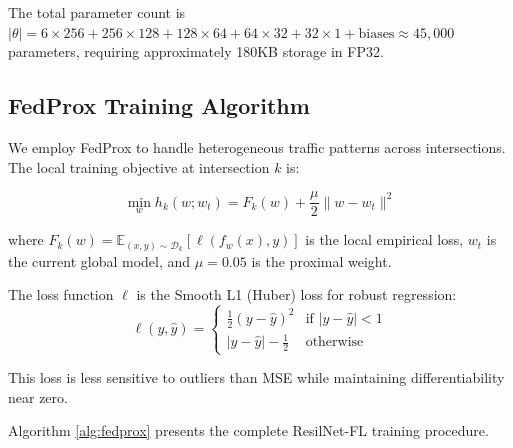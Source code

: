\documentclass[conference]{IEEEtran}
\begin{document}
The total parameter count is $|\theta| = 6 \times 256 + 256 \times 128 + 128 \times 64 + 64 \times 32 + 32 \times 1 + \text{biases} \approx 45,000$ parameters, requiring approximately 180KB storage in FP32.

\subsection{FedProx Training Algorithm}
We employ FedProx to handle heterogeneous traffic patterns across intersections. The local training objective at intersection $k$ is:

\begin{equation}
\min_{w} h_k(w; w_t) = F_k(w) + \frac{\mu}{2} \|w - w_t\|^2
\end{equation}

where $F_k(w) = \mathbb{E}_{(x,y) \sim \mathcal{D}_k}[\ell(f_w(x), y)]$ is the local empirical loss, $w_t$ is the current global model, and $\mu = 0.05$ is the proximal weight.

The loss function $\ell$ is the Smooth L1 (Huber) loss for robust regression:
\begin{equation}
\ell(y, \hat{y}) = \begin{cases}
\frac{1}{2}(y - \hat{y})^2 & \text{if } |y - \hat{y}| < 1 \\
|y - \hat{y}| - \frac{1}{2} & \text{otherwise}
\end{cases}
\end{equation}

This loss is less sensitive to outliers than MSE while maintaining differentiability near zero.

Algorithm \ref{alg:fedprox} presents the complete ResilNet-FL training procedure.
\end{document}
